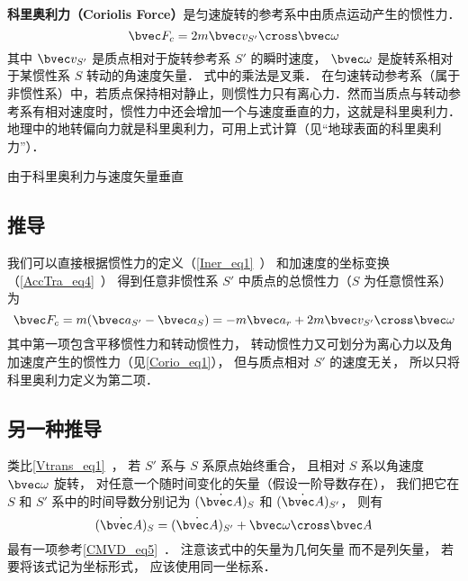 

\textbf{科里奥利力（Coriolis Force）}是匀速旋转的参考系中由质点运动产生的惯性力．
\begin{equation}
\bvec F_c = 2m \bvec v_{S'} \cross \bvec \omega
\end{equation}
其中 $\bvec v_{S'}$ 是质点相对于旋转参考系 $S'$ 的瞬时速度， $\bvec\omega$ 是旋转系相对于某惯性系 $S$ 转动的角速度矢量．%
式中的乘法是叉乘．
在匀速转动参考系（属于非惯性系）中，若质点保持相对静止，则惯性力只有离心力．然而当质点与转动参考系有相对速度时，惯性力中还会增加一个与速度垂直的力，这就是科里奥利力．地理中的地转偏向力就是科里奥利力，可用上式计算（见“地球表面的科里奥利力”）．

由于科里奥利力与速度矢量垂直

\subsection{推导}
我们可以直接根据惯性力的定义（\autoref{Iner_eq1}~） 和加速度的坐标变换（\autoref{AccTra_eq4}~） 得到任意非惯性系 $S'$ 中质点的总惯性力（$S$ 为任意惯性系） 为
\begin{equation}
\bvec F_c = m( \bvec a_{S'} - \bvec a_{S} ) = -m\bvec a_{r} + 2 m \bvec v_{S'} \cross  \bvec \omega
\end{equation}
其中第一项包含平移惯性力和转动惯性力， 转动惯性力又可划分为离心力以及角加速度产生的惯性力（见\autoref{Corio_eq1}）， 但与质点相对 $S'$ 的速度无关， 所以只将科里奥利力定义为第二项．

\subsection{另一种推导}
类比\autoref{Vtrans_eq1}~， 若 $S'$ 系与 $S$ 系原点始终重合， 且相对 $S$ 系以角速度 $\bvec\omega$ 旋转， 对任意一个随时间变化的矢量（假设一阶导数存在）， 我们把它在 $S$ 和 $S'$ 系中的时间导数分别记为 $(\dot{\bvec A})_{S}$ 和 $(\dot{\bvec A})_{S'}$， 则有
\begin{equation}\label{Corio_eq4}
(\dot{\bvec A})_{S} = (\dot{\bvec A})_{S'} + \bvec\omega\cross\bvec A
\end{equation}
最有一项参考\autoref{CMVD_eq5}~． 注意该式中的矢量为几何矢量 而不是列矢量， 若要将该式记为坐标形式， 应该使用同一坐标系．

